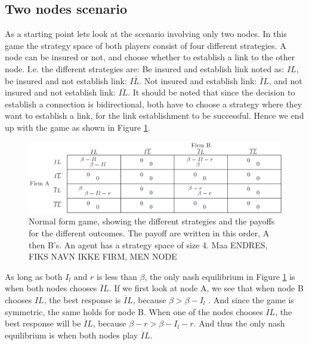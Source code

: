\subsection{Two nodes scenario}
As a starting point lets look at the scenario involving only two nodes. In this game the strategy space of both players consist of four different strategies. A node can be insured or not, and choose whether to establish a link to the other node. I.e. the different strategies are: Be insured and establish link noted as: $IL$, 
be insured and not establish link: $I\overline{L}$. Not insured and establish link: $\overline{I}L$, and not insured and not establish link: $\overline{IL}$. It should be noted that since the decision to establish a connection is bidirectional, both have to choose a strategy where they want to establish a link, for the link establishment to be successful. Hence we end up with the game as shown in Figure \ref{fig:FirstGameTheoryModel}.

\begin{figure} 
\centering
\includegraphics[width=1.0\textwidth]{../Figures/FirstGameWithParameters.png}
\caption{\label{fig:FirstGameTheoryModel} Normal form game, showing the different strategies and the payoffs  for the different outcomes. The payoff are written in this order, A then B's. An agent has a strategy space of size 4. Maa ENDRES, FIKS NAVN IKKE FIRM, MEN NODE}
\end{figure}

As long as both $I_{l} \text{ and } r$ is less than $\beta$, the only nash equilibrium in Figure \ref{fig:FirstGameTheoryModel} is when both nodes chooses $\overline{I}L$. If we first look at node A, we see that when node B chooses $IL$, the best response is $\overline{I}L$, because $ \beta >\beta- I_{l}$ . And since the game is symmetric, the same holds for node B. 
When one of the nodes chooses $\overline{I}L$, the best response will be $\overline{I}L$, because $\beta - r>\beta - I_{l} - r  $. 
And thus the only nash equilibrium is when both nodes play $\overline{I}L$.

